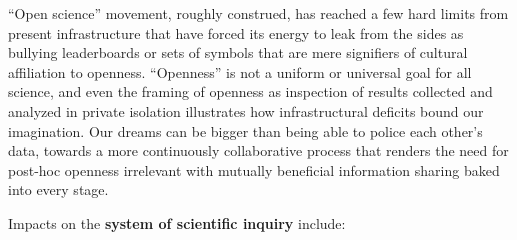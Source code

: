 \begin{itemize}
  ``Open science'' movement, roughly construed, has reached a few hard
  limits from present infrastructure that have forced its energy to leak
  from the sides as bullying leaderboards or sets of symbols that are
  mere signifiers of cultural affiliation to openness. ``Openness'' is
  not a uniform or universal goal for all science, and even the framing
  of openness as inspection of results collected and analyzed in private
  isolation illustrates how infrastructural deficits bound our
  imagination. Our dreams can be bigger than being able to police each
  other's data, towards a more continuously collaborative process that
  renders the need for post-hoc openness irrelevant with mutually
  beneficial information sharing baked into every stage.
\end{itemize}

Impacts on the \textbf{system of scientific inquiry} include:

